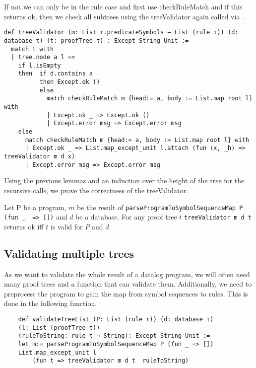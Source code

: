 If not we can only be in the rule case and first use checkRuleMatch and if this returns ok, then we check all subtrees using the treeValidator again called via \Listmapexceptunit.

\begin{lstlisting}
def treeValidator (m: List τ.predicateSymbols → List (rule τ)) (d: database τ) (t: proofTree τ) : Except String Unit :=
  match t with
  | tree.node a l =>
    if l.isEmpty
    then  if d.contains a
          then Except.ok ()
          else
            match checkRuleMatch m {head:= a, body := List.map root l} with
            | Except.ok _ => Except.ok ()
            | Except.error msg => Except.error msg
    else
      match checkRuleMatch m {head:= a, body := List.map root l} with
      | Except.ok _ => List.map_except_unit l.attach (fun ⟨x, _h⟩ => treeValidator m d x)
      | Except.error msg => Except.error msg
\end{lstlisting}

Using the previous lemmas and an induction over the height of the tree for the recursive calls, we prove the correctness of the treeValidator.

\begin{theorem}[\treeValidatorOkIffIsValid]\label{trm:treeValidator}
    Let P be a program, $m$ be the result of \lstinline|parseProgramToSymbolSequenceMap P (fun _  => [])| and $d$ be a database. For any proof tree $t$ \lstinline|treeValidator m d t| returns ok iff $t$ is valid for $P$ and $d$.
\end{theorem}

\subsection{Validating multiple trees}

As we want to validate the whole result of a datalog program, we will often need many proof trees and a function that can validate them. Additionally, we need to preprocess the program to gain the map from symbol sequences to rules. This is done in the following function.

\begin{lstlisting}
    def validateTreeList (P: List (rule τ)) (d: database τ) 
    (l: List (proofTree τ)) 
    (ruleToString: rule τ → String): Except String Unit :=
    let m:= parseProgramToSymbolSequenceMap P (fun _ => [])
    List.map_except_unit l 
        (fun t => treeValidator m d t  ruleToString)

\end{lstlisting}

